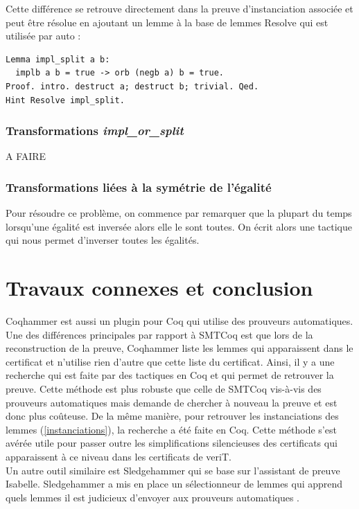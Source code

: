 \documentclass[11pt]{article}
\begin{document}
Cette différence se retrouve directement dans la preuve d'instanciation associée et peut être résolue en ajoutant un lemme à la base de lemmes Resolve qui est utilisée par auto :

\begin{lstlisting}[frame=single]
Lemma impl_split a b:
  implb a b = true -> orb (negb a) b = true.
Proof. intro. destruct a; destruct b; trivial. Qed.
Hint Resolve impl_split.
\end{lstlisting}

\subsubsection{Transformations \textit{impl\_or\_split}}

A FAIRE

\subsubsection{Transformations liées à la symétrie de l'égalité}

Pour résoudre ce problème, on commence par remarquer que la plupart du temps lorsqu'une égalité est inversée alors elle le sont toutes. On écrit alors une tactique qui nous permet d'inverser toutes les égalités. 


\section{Travaux connexes et conclusion}

Coqhammer \cite{coqhammer} est aussi un plugin pour Coq qui utilise des prouveurs automatiques. Une des différences principales par rapport à SMTCoq est que lors de la reconstruction de la preuve, Coqhammer liste les lemmes qui apparaissent dans le certificat et n'utilise rien d'autre que cette liste du certificat. Ainsi, il y a une recherche qui est faite par des tactiques en Coq et qui permet de retrouver la preuve. Cette méthode est plus robuste que celle  de SMTCoq vis-à-vis des prouveurs automatiques mais demande de chercher à nouveau la preuve et est donc plus coûteuse. De la même manière, pour retrouver les instanciations des lemmes (\ref{instanciations}), la recherche a été faite en Coq. Cette méthode s'est avérée utile pour passer outre les simplifications silencieuses des certificats qui apparaissent à ce niveau dans les certificats de veriT. \\
Un autre outil similaire est Sledgehammer \cite{sledgehammer_manual} qui se base sur l'assistant de preuve Isabelle. Sledgehammer a mis en place un sélectionneur de lemmes qui apprend quels lemmes il est judicieux d'envoyer aux prouveurs automatiques \cite{hol_selector}.\\
\end{document}
